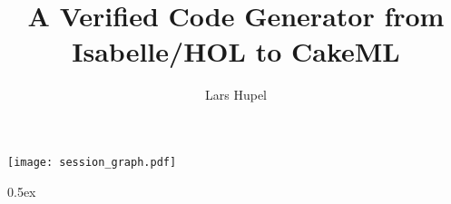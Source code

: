 \documentclass[11pt,a4paper]{report}
\begin{document}
\title{A Verified Code Generator from Isabelle/HOL to CakeML}
\author{Lars Hupel}
\maketitle

\tableofcontents

\clearpage
\texttt{[image: session\_graph.pdf]}
\clearpage

\parindent 0pt\parskip 0.5ex



%
%
\end{document}
